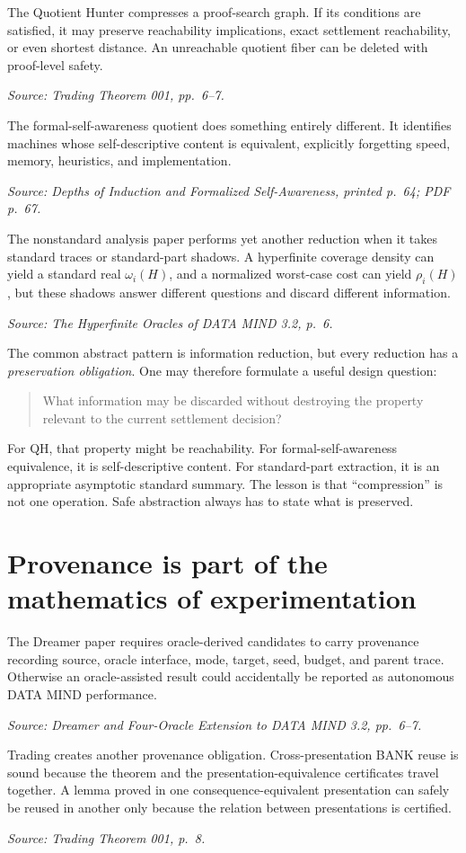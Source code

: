 \documentclass[11pt]{article}
\newcommand{\src}[1]{\par\smallskip\noindent\textit{Source: #1}\normalsize}
\begin{document}
The Quotient Hunter compresses a proof-search graph. If its conditions are satisfied, it may preserve reachability implications, exact settlement reachability, or even shortest distance. An unreachable quotient fiber can be deleted with proof-level safety.
\src{\emph{Trading Theorem 001}, pp.~6--7.}

The formal-self-awareness quotient does something entirely different. It identifies machines whose self-descriptive content is equivalent, explicitly forgetting speed, memory, heuristics, and implementation.
\src{\emph{Depths of Induction and Formalized Self-Awareness}, printed p.~64; PDF p.~67.}

The nonstandard analysis paper performs yet another reduction when it takes standard traces or standard-part shadows. A hyperfinite coverage density can yield a standard real $\omega_i(H)$, and a normalized worst-case cost can yield $\rho_i(H)$, but these shadows answer different questions and discard different information.
\src{\emph{The Hyperfinite Oracles of DATA MIND 3.2}, p.~6.}

The common abstract pattern is information reduction, but every reduction has a \emph{preservation obligation}. One may therefore formulate a useful design question:

\begin{quote}
What information may be discarded without destroying the property relevant to the current settlement decision?
\end{quote}

For QH, that property might be reachability. For formal-self-awareness equivalence, it is self-descriptive content. For standard-part extraction, it is an appropriate asymptotic standard summary. The lesson is that ``compression'' is not one operation. Safe abstraction always has to state what is preserved.

\section{Provenance is part of the mathematics of experimentation}

The Dreamer paper requires oracle-derived candidates to carry provenance recording source, oracle interface, mode, target, seed, budget, and parent trace. Otherwise an oracle-assisted result could accidentally be reported as autonomous DATA MIND performance.
\src{\emph{Dreamer and Four-Oracle Extension to DATA MIND 3.2}, pp.~6--7.}

Trading creates another provenance obligation. Cross-presentation BANK reuse is sound because the theorem and the presentation-equivalence certificates travel together. A lemma proved in one consequence-equivalent presentation can safely be reused in another only because the relation between presentations is certified.
\src{\emph{Trading Theorem 001}, p.~8.}
\end{document}
